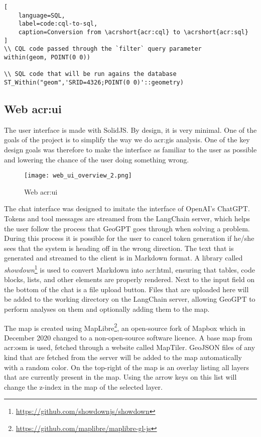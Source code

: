 \begin{lstlisting}[
    language=SQL,
    label=code:cql-to-sql,
    caption=Conversion from \acrshort{acr:cql} to \acrshort{acr:sql}
]
\\ CQL code passed through the `filter` query parameter
within(geom, POINT(0 0))

\\ SQL code that will be run agains the database
ST_Within("geom",'SRID=4326;POINT(0 0)'::geometry)
\end{lstlisting}

\subsection[Web UI]{Web \acrshort{acr:ui}}

The user interface is made with SolidJS. By design, it is very minimal. One of the goals of the project is to simplify the way we do \acrshort{acr:gis} analysis. One of the key design goals was therefore to make the interface as familiar to the user as possible and lowering the chance of the user doing something wrong.

\begin{figure}[h]
    \centering
    \texttt{[image: web\_ui\_overview\_2.png]}
    \caption{Web \acrshort{acr:ui}}
    \label{fig:web-ui}
\end{figure}

The chat interface was designed to imitate the interface of OpenAI's ChatGPT. Tokens and tool messages are streamed from the LangChain server, which helps the user follow the process that GeoGPT goes through when solving a problem. During this process it is possible for the user to cancel token generation if he/she sees that the system is heading off in the wrong direction. The text that is generated and streamed to the client is in Markdown format. A library called \textit{showdown}\footnote{\url{https://github.com/showdownjs/showdown}} is used to convert Markdown into \acrshort{acr:html}, ensuring that tables, code blocks, lists, and other elements are properly rendered. Next to the input field on the bottom of the chat is a file upload button. Files that are uploaded here will be added to the working directory on the LangChain server, allowing GeoGPT to perform analyses on them and optionally adding them to the map.

The map is created using MapLibre\footnote{\url{https://github.com/maplibre/maplibre-gl-js}}, an open-source fork of Mapbox which in December 2020 changed to a non-open-source software licence. A base map from \gls{acr:osm} is used, fetched through a website called MapTiler. GeoJSON files of any kind that are fetched from the server will be added to the map automatically with a random color. On the top-right of the map is an overlay listing all layers that are currently present in the map. Using the arrow keys on this list will change the z-index in the map of the selected layer.



